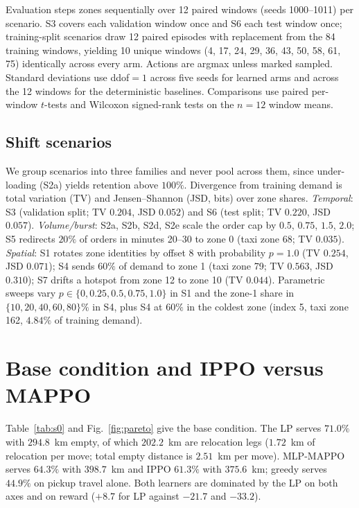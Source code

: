 \documentclass[3p,times,procedia]{elsarticle}
\begin{document}
Evaluation steps zones sequentially over 12 paired windows (seeds 1000--1011) per scenario. S3 covers each validation window once and S6 each test window once; training-split scenarios draw 12 paired episodes with replacement from the 84 training windows, yielding 10 unique windows (4, 17, 24, 29, 36, 43, 50, 58, 61, 75) identically across every arm. Actions are argmax unless marked sampled. Standard deviations use ddof${}=1$ across five seeds for learned arms and across the 12 windows for the deterministic baselines. Comparisons use paired per-window $t$-tests and Wilcoxon signed-rank tests on the $n=12$ window means.

\subsection{Shift scenarios}
\label{sec:taxonomy}

We group scenarios into three families and never pool across them, since under-loading (S2a) yields retention above $100\%$. Divergence from training demand is total variation (TV) and Jensen--Shannon (JSD, bits) over zone shares. \emph{Temporal}: S3 (validation split; TV $0.204$, JSD $0.052$) and S6 (test split; TV $0.220$, JSD $0.057$). \emph{Volume/burst}: S2a, S2b, S2d, S2e scale the order cap by $0.5$, $0.75$, $1.5$, $2.0$; S5 redirects $20\%$ of orders in minutes 20--30 to zone 0 (taxi zone 68; TV $0.035$). \emph{Spatial}: S1 rotates zone identities by offset 8 with probability $p=1.0$ (TV $0.254$, JSD $0.071$); S4 sends $60\%$ of demand to zone 1 (taxi zone 79; TV $0.563$, JSD $0.310$); S7 drifts a hotspot from zone 12 to zone 10 (TV $0.044$). Parametric sweeps vary $p\in\{0,0.25,0.5,0.75,1.0\}$ in S1 and the zone-1 share in $\{10,20,40,60,80\}\%$ in S4, plus S4 at $60\%$ in the coldest zone (index 5, taxi zone 162, $4.84\%$ of training demand).

\section{Base condition and IPPO versus MAPPO}
\label{sec:results}

Table~\ref{tab:s0} and Fig.~\ref{fig:pareto} give the base condition. The LP serves $71.0\%$ with $294.8$~km empty, of which $202.2$~km are relocation legs ($1.72$~km of relocation per move; total empty distance is $2.51$~km per move). MLP-MAPPO serves $64.3\%$ with $398.7$~km and IPPO $61.3\%$ with $375.6$~km; greedy serves $44.9\%$ on pickup travel alone. Both learners are dominated by the LP on both axes and on reward ($+8.7$ for LP against $-21.7$ and $-33.2$).
\end{document}
